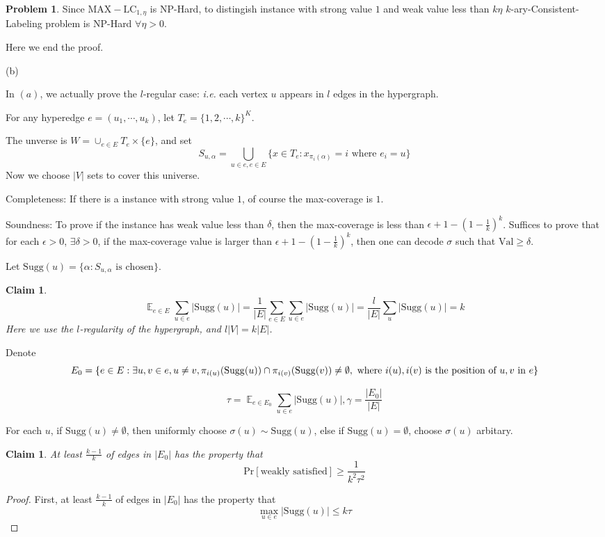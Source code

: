\documentclass[a4paper]{article}
\theoremstyle{definition}
\newtheorem{problem}{Problem}
\theoremstyle{plain}
\newtheorem{claim}[definition]{Claim}
\newcommand{\Ebb}{\mathop\mathbb E}
\newcommand{\<}{\left<}
\renewcommand{\>}{\right>}
\numberwithin{equation}{problem}
\newcommand{\ie}{ \textit{ i.e. } }
\begin{document}
\begin{problem}
    Since  $ \mathrm{MAX-LC}_{1,\eta} $ is NP-Hard, to distingish instance with strong value $ 1 $ and weak value less than  $ k\eta $  $ k $-ary-Consistent-Labeling problem is NP-Hard  $ \forall \eta>0 $.
    
    Here we end the proof.

    (b)

    In  $ (a) $, we actually prove the $ l $-regular case: \ie each vertex  $ u $ appears in  $ l $  edges in the hypergraph.  

    For any hyperedge  $ e=(u_1,\cdots,u_k) $, let  $ T_e=\{1,2,\cdots,k\}^K $.
    
    The unverse is  $ W=\cup_{e\in E}T_e\times\{e\} $, and set 
    \[S_{u,\alpha}=\bigcup_{u\in e,e\in E}\{x\in T_e:x_{\pi_{i}(\alpha)}=i\text{ where }e_i=u\}\]
    Now we choose  $ |V| $ sets to cover this universe. 

    Completeness: If there is a instance with strong value  $ 1 $, of course the max-coverage is  $ 1 $.   

    Soundness: To prove if the instance has weak value less than  $ \delta $, then the max-coverage is less than  $ \epsilon+1-(1-\frac{1}{k})^k $. Suffices to prove that for each  $ \epsilon>0 $,  $ \exists \delta>0 $,   if the max-coverage value is larger than  $ \epsilon+1-(1-\frac{1}{k})^k $, then one can decode  $ \sigma $ such that  $ \mathrm{Val} \geq \delta $.

    \newcommand{\Sugg }{\mathrm{Sugg}}
    Let  $ \Sugg(u)=\{\alpha:S_{u,\alpha}\text{ is chosen}\} $.
    
    \begin{claim}
      \[\Ebb_{e\in E}\sum_{u\in e}|\mathrm{Sugg}(u)|=\frac{1}{|E|}\sum_{e\in E}\sum_{u\in e}|\mathrm{Sugg}(u)|=\frac{l}{|E|}\sum_{u}|\mathrm{Sugg}(u)|=k\]
      Here we use the  $ l $-regularity of the hypergraph, and  $ l|V|=k|E| $. 
    \end{claim}

    Denote 
    \[E_0=\{e\in E:\exists u,v\in e,u\neq v,\pi_{i(u)}(\Sugg(u))\cap \pi_{i(v)}(\Sugg(v))\neq \emptyset,\text{ where  $ i(u),i(v) $ is the position of  $ u,v $ in  $ e $}\}\]

    \[\tau=\Ebb_{e\in E_0}\sum_{u\in e}|\mathrm{Sugg}(u)|,\gamma=\frac{|E_0|}{|E|}\]

    For each  $ u $, if  $ \Sugg (u)\neq \emptyset $, then uniformly choose  $ \sigma(u)\sim \Sugg(u)  $, else if  $ \Sugg(u)=\emptyset $, choose  $ \sigma(u) $ arbitary.     
    \begin{claim}\label{claim}
      At least  $ \frac{k-1}{k} $ of edges in  $ |E_0| $ has the property that 
      \[\mathrm{Pr}[\text{weakly satisfied}] \geq \frac{1}{k^2\tau^2}\]  
    \end{claim}
    \begin{proof}
      First, at least  $ \frac{k-1}{k} $ of edges in  $ |E_0| $ has the property that 
      \[\max_{u\in e}|\Sugg(u)|  \leq  k\tau\]  


\end{proof}
\end{problem}
\end{document}
